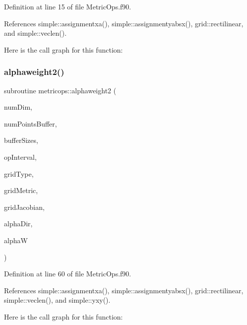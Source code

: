Definition at line 15 of file Metric\+Ops.\+f90.



References simple\+::assignmentxa(), simple\+::assignmentyabsx(), grid\+::rectilinear, and simple\+::veclen().

Here is the call graph for this function\+:
\hypertarget{namespacemetricops_abf449970c4b90017443108f34a3cf4d0}{}\label{namespacemetricops_abf449970c4b90017443108f34a3cf4d0} 
\subsubsection{\texorpdfstring{alphaweight2()}{alphaweight2()}}
{\footnotesize\ttfamily subroutine metricops\+::alphaweight2 (\begin{DoxyParamCaption}\item[{integer(kind=4), intent(in)}]{num\+Dim,  }\item[{integer(kind=8), intent(in)}]{num\+Points\+Buffer,  }\item[{integer(kind=8), dimension(numdim), intent(in)}]{buffer\+Sizes,  }\item[{integer(kind=8), dimension(2$\ast$numdim), intent(in)}]{op\+Interval,  }\item[{integer(kind=4), intent(in)}]{grid\+Type,  }\item[{real(kind=8), dimension(numdim$\ast$numdim$\ast$numpointsbuffer), intent(in), target}]{grid\+Metric,  }\item[{real(kind=8), dimension(numpointsbuffer), intent(in), target}]{grid\+Jacobian,  }\item[{integer(kind=4), intent(in)}]{alpha\+Dir,  }\item[{real(kind=8), dimension(numpointsbuffer), intent(out)}]{alphaW }\end{DoxyParamCaption})}



Definition at line 60 of file Metric\+Ops.\+f90.



References simple\+::assignmentxa(), simple\+::assignmentyabsx(), grid\+::rectilinear, simple\+::veclen(), and simple\+::yxy().

Here is the call graph for this function\+:
\hypertarget{namespacemetricops_a559dbfa02010196e008715e7a019a2cd}{}\label{namespacemetricops_a559dbfa02010196e008715e7a019a2cd} 
